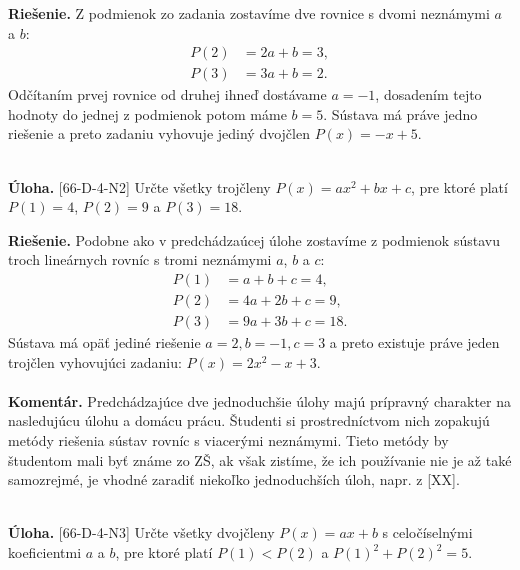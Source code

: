 \documentclass[11pt,a4paper,oneside,final]{book}
\newcommand{\kom}{\textbf{Komentár.} }
\newcommand{\ul}{\textbf{Úloha.} }
\newcommand{\rie}{\textbf{Riešenie.} }
\begin{document}
\rie Z podmienok zo zadania zostavíme dve rovnice s dvomi neznámymi $a$ a $b$:
\begin{align*}
P (2) &= 2a + b = 3,\\
P (3) &= 3a + b = 2.
\end{align*}
Odčítaním prvej rovnice od druhej ihneď dostávame $a = -1$, dosadením tejto hodnoty do jednej z podmienok potom máme $b= 5$. Sústava má práve jedno riešenie a preto zadaniu vyhovuje jediný dvojčlen $P(x)=-x+5$.\\
\\
\begin{tcolorbox}[breakable,notitle,boxrule=0pt,colback=light-gray,colframe=light-gray]\ul [66-D-4-N2] Určte všetky trojčleny $P (x) = ax^2+ bx + c$, pre ktoré platí $P (1) = 4$, $P (2) = 9$ a $P (3) = 18$.

\end{tcolorbox}

\rie Podobne ako v predchádzaúcej úlohe zostavíme z podmienok sústavu troch lineárnych rovníc s tromi neznámymi $a$, $b$ a $c$:
\begin{align*}
P(1) &= a + b + c = 4, \\
P(2) &= 4a + 2b + c = 9, \\
P(3) &= 9a + 3b + c = 18.
\end{align*}
Sústava má opäť jediné riešenie $a = 2, b = -1, c = 3$ a preto existuje práve jeden trojčlen vyhovujúci zadaniu: $P(x)=2x^2-x+3$.\\
\\
\kom Predchádzajúce dve jednoduchšie úlohy majú prípravný charakter na nasledujúcu úlohu a domácu prácu. Študenti si prostredníctvom nich zopakujú metódy riešenia sústav rovníc s viacerými neznámymi. Tieto metódy by študentom mali byť známe zo ZŠ, ak však zistíme, že ich používanie nie je až také samozrejmé, je vhodné zaradiť niekoľko jednoduchších úloh, napr. z [XX].\\
\\
\begin{tcolorbox}[breakable,notitle,boxrule=0pt,colback=light-gray,colframe=light-gray]\ul [66-D-4-N3] Určte všetky dvojčleny $P (x) = ax+b$ s celočíselnými koeficientmi $a$ a $b$, pre ktoré platí $P (1) < P (2)$ a $P (1)^2+ P(2)^2= 5$.

\end{tcolorbox}
\end{document}
